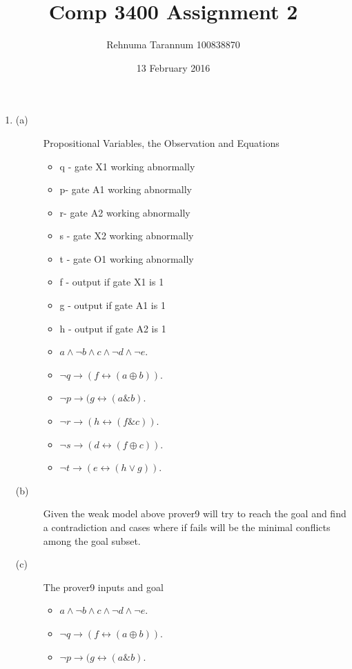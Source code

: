 \documentclass{article}
\title{Comp 3400 Assignment 2}
\author{Rehnuma Tarannum 100838870}
\date{13 February 2016}
\begin{document}
\maketitle
\begin{enumerate}
    \item 
    \begin{description}
    \item[(a)] Propositional Variables, the Observation and Equations
    \begin{itemize}
        \item q - gate X1 working abnormally
        \item p- gate A1 working abnormally
        \item r- gate A2 working abnormally
        \item s - gate X2 working abnormally
        \item t - gate O1 working abnormally
        \item f - output if gate X1 is 1
        \item g - output if gate A1 is 1
        \item h - output if gate A2 is 1
        \item $ a \wedge \neg b \wedge c \wedge \neg d \wedge \neg e $.
        \item $ \neg q \rightarrow ( f \leftrightarrow ( a \oplus b)) $.
        \item $ \neg p \rightarrow ( g \leftrightarrow ( a \& b )$.
        \item $ \neg r \rightarrow ( h \leftrightarrow ( f \& c))$.
        \item $ \neg s \rightarrow ( d \leftrightarrow ( f \oplus c))$.
        \item $ \neg t \rightarrow ( e \leftrightarrow ( h \vee g))$.
    \end{itemize}
    \item [(b)] Given the weak model above prover9 will try to reach the goal and 
    find a contradiction and cases where if fails will be the minimal conflicts 
    among the goal subset.
    \item[(c)] The prover9 inputs and goal
    \begin{itemize}
        \item $ a \wedge \neg b \wedge c \wedge \neg d \wedge \neg e $.
        \item $ \neg q \rightarrow ( f \leftrightarrow ( a \oplus b)) $.
        \item $ \neg p \rightarrow ( g \leftrightarrow ( a \& b )$.

\end{itemize}
\end{description}
\end{enumerate}
\end{document}
